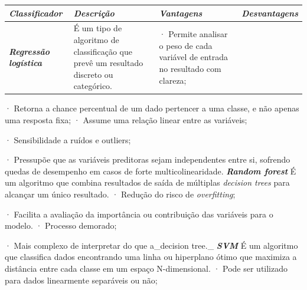 \documentclass[
  brazilian,
  11pt,
]{article}
\newcounter{none} %
\begin{document}
{\def\LTcaptype{none} %
\begin{longtable}[]{@{}
  >{\raggedright\arraybackslash}p{}
  >{\raggedright\arraybackslash}p{}
  >{\raggedright\arraybackslash}p{}
  >{\raggedright\arraybackslash}p{}@{}}
\toprule\noalign{}
\begin{minipage}[b]{\linewidth}\raggedright
\textbf{\emph{Classificador}}
\end{minipage} & \begin{minipage}[b]{\linewidth}\raggedright
\textbf{\emph{Descrição}}
\end{minipage} & \begin{minipage}[b]{\linewidth}\raggedright
\textbf{\emph{Vantagens}}
\end{minipage} & \begin{minipage}[b]{\linewidth}\raggedright
\textbf{\emph{Desvantagens}}
\end{minipage} \\
\midrule\noalign{}
\endhead
\bottomrule\noalign{}
\endlastfoot
\textbf{\emph{Regressão logística}} & É um tipo de algoritmo de classificação que prevê um resultado discreto ou categórico. & · Permite analisar o peso de cada variável de entrada no resultado com clareza; & \\
\end{longtable}
}

· Retorna a chance percentual de um dado pertencer a uma classe, e não apenas uma resposta fixa; \textbar{} · Assume uma relação linear entre as variáveis;

· Sensibilidade a ruídos e outliers;

· Pressupõe que as variáveis preditoras sejam independentes entre si, sofrendo quedas de desempenho em casos de forte multicolinearidade. \textbar{}
\textbar{} \textbf{\emph{Random forest}} \textbar{} É um algoritmo que combina resultados de saída de múltiplas \emph{decision trees} para alcançar um único resultado. \textbar{} · Redução do risco de \emph{overfitting};

· Facilita a avaliação da importância ou contribuição das variáveis para o modelo. \textbar{} · Processo demorado;

· Mais complexo de interpretar do que a\_decision tree.\_ \textbar{}
\textbar{} \textbf{\emph{SVM}} \textbar{} É um algoritmo que classifica dados encontrando uma linha ou hiperplano ótimo que maximiza a distância entre cada classe em um espaço N-dimensional. \textbar{} · Pode ser utilizado para dados linearmente separáveis ou não;
\end{document}

